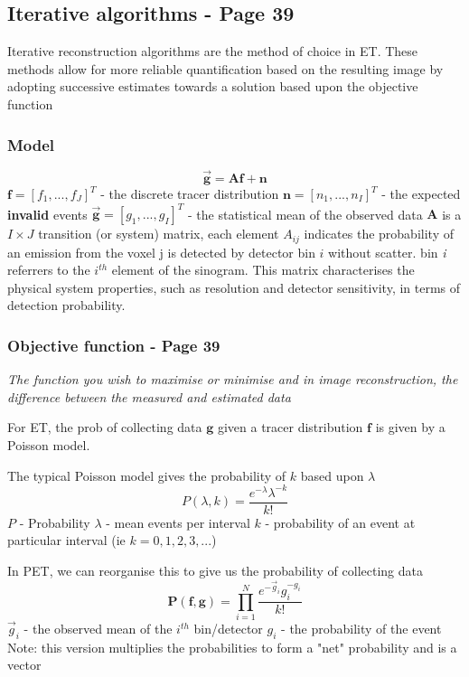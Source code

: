 \documentclass{article}
\begin{document}
\subsection{Iterative algorithms - Page 39}
Iterative reconstruction algorithms are the method of choice in ET. These methods allow for more reliable quantification based on the resulting image by adopting successive estimates towards a solution based upon the objective function
\subsubsection{Model}
\[\vec{\textbf{g}} = \textbf{A}\textbf{f} + \textbf{n}\]
$\textbf{f} = [f_1, ... , f_J]^T $ - the discrete tracer distribution 
$\textbf{n} = [n_1, ... , n_I]^T $ - the expected \textbf{invalid} events
$\vec{\textbf{g}} = [g_1, ... , g_I]^T $  - the statistical mean of the observed data
$\textbf{A}$ is a $I \times J$ transition (or system) matrix, each element $A_{ij}$ indicates the probability of an emission from the voxel j is detected by detector bin $i$ without scatter. bin \textit{i} referrers to the $i^{th}$ element of the sinogram. This matrix characterises the physical system properties, such as resolution and detector sensitivity, in terms of detection probability.

\subsubsection{Objective function  - Page 39}
\textit{The function you wish to maximise or minimise and in image reconstruction, the difference between the measured and estimated data}

For ET,  the prob of collecting data $\textbf{g}$ given a tracer distribution $\textbf{f}$ is given by a Poisson model.

The typical Poisson model gives the probability of $k$ based upon $\lambda$
\[
P(\lambda,k) = 
\frac{e^{-\lambda} \lambda^{-k}}{k!}
\]
$P$ - Probability 
$\lambda$ - mean events per interval
$k$ - probability of an event at particular interval (ie $k = 0,1,2,3,...$)

In PET, we can reorganise this to give us the probability of collecting data
\[
\textbf{P}(\textbf{f},\textbf{g}) = 
\prod_{i=1}^{N}
\frac{e^{-\vec{g}_i} g_i^{-g_i}}{k!}
\]
$\vec{g}_i$ - the observed mean of the $i^{th}$ bin/detector
$g_i$ - the probability of the event
Note: this version multiplies the probabilities to form a "net" probability and is a vector
\end{document}
